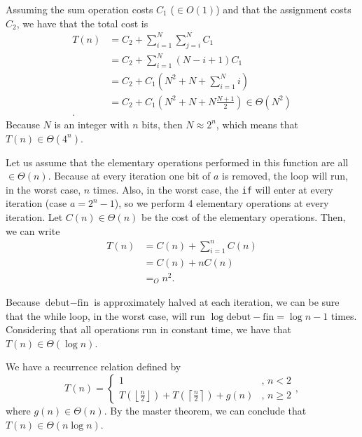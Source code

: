 Assuming the sum operation costs $C_1$ ($\in O(1)$) and that the assignment costs $C_2$, we have that the total cost is
\begin{align*}
    T(n) &= C_2 + \sum_{i=1}^{N} \sum_{j=i}^{N} C_1 \\
    &= C_2 + \sum_{i=1}^{N} (N-i + 1)C_1 \\
    &= C_2 + C_1\left( N^2 + N + \sum_{i=1}^{N} i \right)  \\
    &= C_2 + C_1\left( N^2 + N + N \frac{N+1}{2} \right) \in \Theta(N^2) \\
.\end{align*}
Because $N$ is an integer with $n$ bits, then $N \approx 2^{n}$, which means that $T(n) \in \Theta(4^{n})$.


Let us assume that the elementary operations performed in this function are all $\in \Theta(n)$.
Because at every iteration one bit of $a$ is removed, the loop will run, in the worst case, $n$ times.
Also, in the worst case, the \texttt{if} will enter at every iteration (case $a=2^{n}-1$), so we perform 4 elementary operations at every iteration.
Let $C(n)\in \Theta(n)$ be the cost of the elementary operations.
Then, we can write
\begin{align*}
    T(n) &= C(n) + \sum_{i=1}^{n} C(n) \\
    &= C(n) + n C(n) \\
    &=_O n^2
.\end{align*}


Because $\text{debut}-\text{fin}$ is approximately halved at each iteration, we can be sure that the while loop, in the worst case, will run $\log \text{debut}- \text{fin} = \log n-1$ times.
Considering that all operations run in constant time, we have that $T(n) \in \Theta(\log n)$.


We have a recurrence relation defined by \[
T(n) = \begin{cases}
    1 &,\, n<2 \\
    T(\left\lfloor \frac{n}{2} \right\rfloor) + T(\left\lceil \frac{n}{2} \right\rceil ) + g(n) &,\, n\ge 2
\end{cases}
,\] where $g(n) \in \Theta(n)$.
By the master theorem, we can conclude that $T(n) \in \Theta(n \log n)$.



